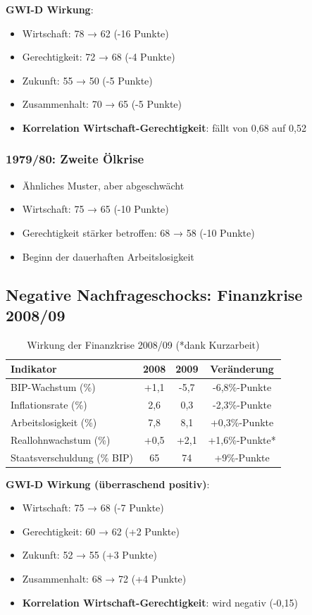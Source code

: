 \textbf{GWI-D Wirkung}:
\begin{itemize}
\item Wirtschaft: 78 → 62 (-16 Punkte)
\item Gerechtigkeit: 72 → 68 (-4 Punkte)
\item Zukunft: 55 → 50 (-5 Punkte)
\item Zusammenhalt: 70 → 65 (-5 Punkte)
\item \textbf{Korrelation Wirtschaft-Gerechtigkeit}: fällt von 0,68 auf 0,52
\end{itemize}

\subsubsection{1979/80: Zweite Ölkrise}

\begin{itemize}
\item Ähnliches Muster, aber abgeschwächt
\item Wirtschaft: 75 → 65 (-10 Punkte)
\item Gerechtigkeit stärker betroffen: 68 → 58 (-10 Punkte)
\item Beginn der dauerhaften Arbeitslosigkeit
\end{itemize}

\subsection{Negative Nachfrageschocks: Finanzkrise 2008/09}

\begin{table}[ht]
\centering
\begin{tabular}{lccc}
\toprule
\textbf{Indikator} & \textbf{2008} & \textbf{2009} & \textbf{Veränderung} \\
\midrule
BIP-Wachstum (\%) & +1,1 & -5,7 & -6,8\%-Punkte \\
Inflationsrate (\%) & 2,6 & 0,3 & -2,3\%-Punkte \\
Arbeitslosigkeit (\%) & 7,8 & 8,1 & +0,3\%-Punkte \\
Reallohnwachstum (\%) & +0,5 & +2,1 & +1,6\%-Punkte* \\
Staatsverschuldung (\% BIP) & 65 & 74 & +9\%-Punkte \\
\bottomrule
\end{tabular}
\caption{Wirkung der Finanzkrise 2008/09 (*dank Kurzarbeit)}
\label{tab:finanzkrise-2009}
\end{table}

\textbf{GWI-D Wirkung (überraschend positiv)}:
\begin{itemize}
\item Wirtschaft: 75 → 68 (-7 Punkte)
\item Gerechtigkeit: 60 → 62 (+2 Punkte)
\item Zukunft: 52 → 55 (+3 Punkte)
\item Zusammenhalt: 68 → 72 (+4 Punkte)
\item \textbf{Korrelation Wirtschaft-Gerechtigkeit}: wird negativ (-0,15)
\end{itemize}

